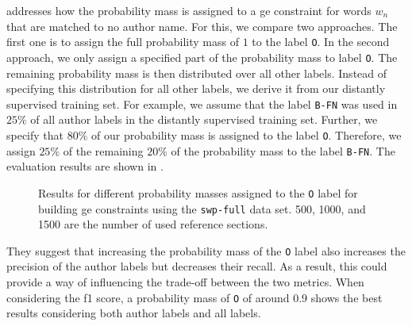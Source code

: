  addresses how the probability mass is assigned to a \gls{ge} constraint for words $w_n$ that are matched to no author name.
For this, we compare two approaches.
The first one is to assign the full probability mass of $1$ to the label \texttt{O}.
In the second approach, we only assign a specified part of the probability mass to label \texttt{O}.
The remaining probability mass is then distributed over all other labels.
Instead of specifying this distribution for all other labels, we derive it from our distantly supervised training set.
For example, we assume that the label \texttt{B-FN} was used in $25\%$ of all author labels in the distantly supervised training set.
Further, we specify that $80\%$ of our probability mass is assigned to the label \texttt{O}.
Therefore, we assign $25\%$ of the remaining $20\%$ of the probability mass to the label \texttt{B-FN}.
The evaluation results are shown in .
\begin{figure}

\caption{Results for different probability masses assigned to the \texttt{O} label for building \gls{ge} constraints using the \texttt{swp-full} data set. 500, 1000, and 1500 are the number of used reference sections.}
\label{fig:eval-other-percentages}
\end{figure}
They suggest that increasing the probability mass of the \texttt{O} label also increases the \gls{precision} of the author labels but decreases their \gls{recall}.
As a result, this could provide a way of influencing the trade-off between the two metrics.
When considering the \gls{f1 score}, a probability mass of \texttt{O} of around 0.9 shows the best results considering both author labels and all labels.

\bigskip

